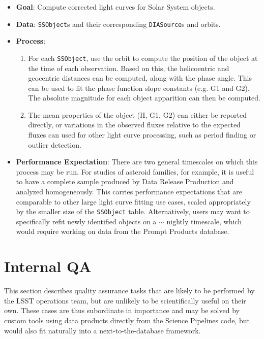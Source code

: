 \documentclass[DM,authoryear,toc]{lsstdoc}
\begin{document}
\begin{itemize}
  \item \textbf{Goal}: Compute corrected light curves for Solar System objects.
  \item \textbf{Data}: \texttt{SSObject}s and their corresponding
  \texttt{DIASource}s and orbits.
  \item \textbf{Process}:
  \begin{enumerate}
    \item For each \texttt{SSObject}, use the orbit to compute the position
    of the object at the time of each observation. Based on this, the
    helicoentric and geocentric distances can be computed, along with the
    phase angle. This can be used to fit the phase function slope constants
    (e.g. G1 and G2). The absolute magnitude for each object
    apparition can then be computed.
    \item The mean properties of the object (H, G1, G2) can either be
    reported directly, or variations in the observed fluxes relative to the
    expected fluxes can used for other light curve processing, such as
    period finding or outlier detection.
  \end{enumerate}
  \item \textbf{Performance Expectation}: There are two general timescales on
  which this process may be run. For studies of asteroid families, for
  example, it is useful to have a complete sample produced by Data Release
  Production and analyzed homogeneously. This carries performance
  expectations that are comparable to other large light curve fitting use
  cases, scaled appropriately by the smaller size of the \texttt{SSObject}
  table. Alternatively, users may want to specifically refit newly identified
  objects on a $\sim$ nightly timescale, which would require working on data
  from the Prompt Products database.
\end{itemize}


\section{Internal QA}

This section describes quality assurance tasks that are likely to be performed
by the LSST operations team, but are unlikely to be scientifically useful on
their own. These cases are thus subordinate in importance and may be solved by
custom tools using data products directly from the Science Pipelines code, but
would also fit naturally into a next-to-the-database framework.
\end{document}

